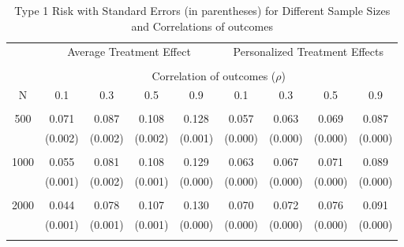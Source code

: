 \begin{table}[H]
\centering
\begin{tabular}{c||cccc|cccc}
\hline\hline
& \multicolumn{4}{c|}{Average Treatment Effect} & \multicolumn{4}{c}{Personalized Treatment Effects} \\
\cline{2-9}
\\
& \multicolumn{8}{c}{Correlation of outcomes ($\rho$)} \\
\cline{2-9}
N & 0.1 & 0.3 & 0.5 & 0.9 & 0.1 & 0.3 & 0.5 & 0.9 \\
\hline
\\
500 & 0.071 & 0.087 & 0.108 & 0.128 & 0.057 & 0.063 & 0.069 & 0.087 \\
& (0.002) & (0.002) & (0.002) & (0.001) & (0.000) & (0.000) & (0.000) & (0.000) \\
\\
1000 & 0.055 & 0.081 & 0.108 & 0.129 & 0.063 & 0.067 & 0.071 & 0.089 \\
& (0.001) & (0.002) & (0.001) & (0.000) & (0.000) & (0.000) & (0.000) & (0.000) \\
\\
2000 & 0.044 & 0.078 & 0.107 & 0.130 & 0.070 & 0.072 & 0.076 & 0.091 \\
& (0.001) & (0.001) & (0.001) & (0.000) & (0.000) & (0.000) & (0.000) & (0.000) \\
\\
\hline\hline
\end{tabular}
\caption{Type 1 Risk with Standard Errors (in parentheses) for Different Sample Sizes and Correlations of outcomes}
\label{tab:type1_risks}
\end{table}
